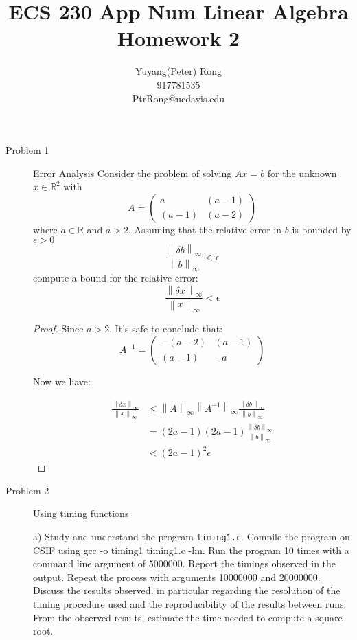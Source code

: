 \documentclass{article}
\title{ECS 230 App Num Linear Algebra \\ Homework 2}
\author{Yuyang(Peter) Rong \\917781535 \\ PtrRong@ucdavis.edu}
\newcommand{\norm}[1]{\left\lVert#1\right\rVert}
\begin{document}
\maketitle

\begin{description}
	\item[Problem 1] Error Analysis
	      Consider the problem of solving $Ax = b$ for the unknown $x \in \mathbb{R}^2$ with
	      \begin{equation}
		      A = \begin{pmatrix} a & (a-1) \\ (a-1) & (a-2)\end{pmatrix}
	      \end{equation}
	      where $a \in \mathbb{R}$ and $a > 2$. Assuming that the relative error in $b$ is bounded by $\epsilon > 0$
	      \begin{equation}
		      \frac{\norm{\delta b}_\infty}{\norm{b}_\infty} < \epsilon
	      \end{equation}
	      compute a bound for the relative error:
	      \begin{equation}
		      \frac{\norm{\delta x}_\infty}{\norm{x}_\infty} < \epsilon
	      \end{equation}

	      \begin{proof}
		      Since $a > 2$, It's safe to conclude that:
		      $$
			      A^{-1} = \begin{pmatrix} -(a-2) & (a-1) \\ (a-1) & -a\end{pmatrix}
		      $$

		      Now we have:

		      \begin{align*}
			      \frac{\norm{\delta x}_\infty}{\norm{x}_\infty}
			       & \le  \norm{A}_\infty\norm{A^{-1}}_\infty\frac{\norm{\delta b}_\infty}{\norm{b}_\infty} \\
			       & =    (2a - 1) (2a - 1)  \frac{\norm{\delta b}_\infty}{\norm{b}_\infty}                 \\
			       & <    (2a - 1)^2\epsilon
		      \end{align*}
	      \end{proof}

	\item[Problem 2] Using timing functions

	      a) Study and understand the program \lstinline{timing1.c}.
	      Compile the program on CSIF using gcc -o timing1 timing1.c -lm.
	      Run the program 10 times with a command line argument of 5000000. Report the timings observed in the output. Repeat the process with arguments 10000000 and 20000000.
	      Discuss the results observed, in particular regarding the resolution of the timing procedure used and the reproducibility of the results between runs. From the observed results,
	      estimate the time needed to compute a square root.


\end{description}
\end{document}
